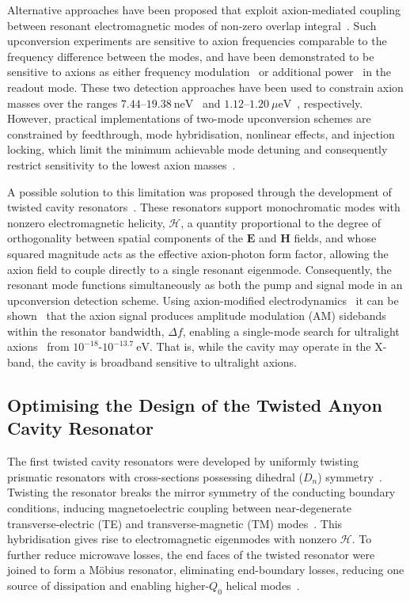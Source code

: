 \documentclass[
  aps,
  physrev,
  reprint,
  superscriptaddress,
  nofootinbib,
  amsmath,
  amssymb
]{revtex4-2}
\begin{document}
Alternative approaches have been proposed that exploit axion-mediated coupling between resonant electromagnetic modes of non-zero overlap integral~\cite{sikivie_superconducting_2013, McAllister2016, goryachev_axion_2019}. Such upconversion experiments are sensitive to axion frequencies comparable to the frequency difference between the modes, and have been demonstrated to be sensitive to axions as either frequency modulation~\cite{UPLOAD2021} or additional power~\cite{Thomson2023} in the readout mode. These two detection approaches have been used to constrain axion masses over the ranges $7.44$–$19.38~\mathrm{neV}$~\cite{UPLOAD2021} and $1.12$–$1.20~\mu\mathrm{eV}$~\cite{Thomson2023}, respectively. However, practical implementations of two-mode upconversion schemes are constrained by feedthrough, mode hybridisation, nonlinear effects, and injection locking, which limit the minimum achievable mode detuning and consequently restrict sensitivity to the lowest axion masses~\cite{Thomson:2021wk}.

A possible solution to this limitation was proposed through the development of twisted cavity resonators~\cite{Bourhill2023}. These resonators support monochromatic modes with nonzero electromagnetic helicity, $\mathscr H$, a quantity proportional to the degree of orthogonality between spatial components of the $\mathbf{E}$ and $\mathbf{H}$ fields, and whose squared magnitude acts as the effective axion-photon form factor, allowing the axion field to couple directly to a single resonant eigenmode. Consequently, the resonant mode functions simultaneously as both the pump and signal mode in an upconversion detection scheme. Using axion-modified electrodynamics~\cite{sikivie_interaction_1984-1,wilczek_two_1987,tobar_modified_2019,tobar_poynting_2022} it can be shown~\cite{Bourhill2023} that the axion signal produces amplitude modulation (AM) sidebands within the resonator bandwidth, $\Delta f$, enabling a single-mode search for ultralight axions~\cite{Bourhill2023} from $10^{-18}$-$10^{-13.7}~\mathrm{eV}$. That is, while the cavity may operate in the X-band, the cavity is broadband sensitive to ultralight axions. 

\subsection{Optimising the Design of the Twisted Anyon Cavity Resonator}
The first twisted cavity resonators were developed by uniformly twisting prismatic resonators with cross-sections possessing dihedral ($D_n$) symmetry~\cite{Bourhill2023}. Twisting the resonator breaks the mirror symmetry of the conducting boundary conditions, inducing magnetoelectric coupling between near-degenerate transverse-electric (TE) and transverse-magnetic (TM) modes~\cite{Bourhill2023,paterson2025electromagnetic,paterson2025dynamicallytuneablehelicitytwisted,paterson_Berry}. This hybridisation gives rise to electromagnetic eigenmodes with nonzero $\mathscr H$. To further reduce microwave losses, the end faces of the twisted resonator were joined to form a M\"obius resonator, eliminating end-boundary losses, reducing one source of dissipation and enabling higher-$Q_0$ helical modes~\cite{Bourhill2023}.
\end{document}
